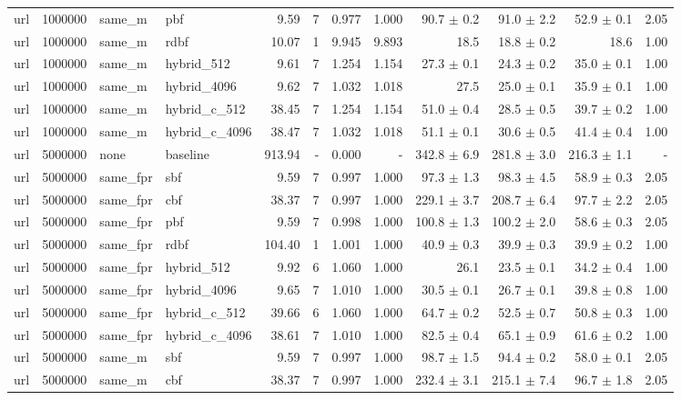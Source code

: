 \begin{tabular}{llllrrrrrrrr}
url & 1000000 & same\_m & pbf & 9.59 & 7 & 0.977 & 1.000 & 90.7 $\pm$ 0.2 & 91.0 $\pm$ 2.2 & 52.9 $\pm$ 0.1 & 2.05 \\
url & 1000000 & same\_m & rdbf & 10.07 & 1 & 9.945 & 9.893 & 18.5 & 18.8 $\pm$ 0.2 & 18.6 & 1.00 \\
url & 1000000 & same\_m & hybrid\_512 & 9.61 & 7 & 1.254 & 1.154 & 27.3 $\pm$ 0.1 & 24.3 $\pm$ 0.2 & 35.0 $\pm$ 0.1 & 1.00 \\
url & 1000000 & same\_m & hybrid\_4096 & 9.62 & 7 & 1.032 & 1.018 & 27.5 & 25.0 $\pm$ 0.1 & 35.9 $\pm$ 0.1 & 1.00 \\
url & 1000000 & same\_m & hybrid\_c\_512 & 38.45 & 7 & 1.254 & 1.154 & 51.0 $\pm$ 0.4 & 28.5 $\pm$ 0.5 & 39.7 $\pm$ 0.2 & 1.00 \\
url & 1000000 & same\_m & hybrid\_c\_4096 & 38.47 & 7 & 1.032 & 1.018 & 51.1 $\pm$ 0.1 & 30.6 $\pm$ 0.5 & 41.4 $\pm$ 0.4 & 1.00 \\
url & 5000000 & none & baseline & 913.94 & - & 0.000 & - & 342.8 $\pm$ 6.9 & 281.8 $\pm$ 3.0 & 216.3 $\pm$ 1.1 & - \\
url & 5000000 & same\_fpr & sbf & 9.59 & 7 & 0.997 & 1.000 & 97.3 $\pm$ 1.3 & 98.3 $\pm$ 4.5 & 58.9 $\pm$ 0.3 & 2.05 \\
url & 5000000 & same\_fpr & cbf & 38.37 & 7 & 0.997 & 1.000 & 229.1 $\pm$ 3.7 & 208.7 $\pm$ 6.4 & 97.7 $\pm$ 2.2 & 2.05 \\
url & 5000000 & same\_fpr & pbf & 9.59 & 7 & 0.998 & 1.000 & 100.8 $\pm$ 1.3 & 100.2 $\pm$ 2.0 & 58.6 $\pm$ 0.3 & 2.05 \\
url & 5000000 & same\_fpr & rdbf & 104.40 & 1 & 1.001 & 1.000 & 40.9 $\pm$ 0.3 & 39.9 $\pm$ 0.3 & 39.9 $\pm$ 0.2 & 1.00 \\
url & 5000000 & same\_fpr & hybrid\_512 & 9.92 & 6 & 1.060 & 1.000 & 26.1 & 23.5 $\pm$ 0.1 & 34.2 $\pm$ 0.4 & 1.00 \\
url & 5000000 & same\_fpr & hybrid\_4096 & 9.65 & 7 & 1.010 & 1.000 & 30.5 $\pm$ 0.1 & 26.7 $\pm$ 0.1 & 39.8 $\pm$ 0.8 & 1.00 \\
url & 5000000 & same\_fpr & hybrid\_c\_512 & 39.66 & 6 & 1.060 & 1.000 & 64.7 $\pm$ 0.2 & 52.5 $\pm$ 0.7 & 50.8 $\pm$ 0.3 & 1.00 \\
url & 5000000 & same\_fpr & hybrid\_c\_4096 & 38.61 & 7 & 1.010 & 1.000 & 82.5 $\pm$ 0.4 & 65.1 $\pm$ 0.9 & 61.6 $\pm$ 0.2 & 1.00 \\
url & 5000000 & same\_m & sbf & 9.59 & 7 & 0.997 & 1.000 & 98.7 $\pm$ 1.5 & 94.4 $\pm$ 0.2 & 58.0 $\pm$ 0.1 & 2.05 \\
url & 5000000 & same\_m & cbf & 38.37 & 7 & 0.997 & 1.000 & 232.4 $\pm$ 3.1 & 215.1 $\pm$ 7.4 & 96.7 $\pm$ 1.8 & 2.05 \\

\end{tabular}
